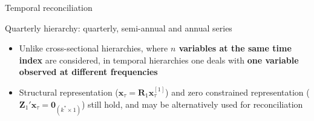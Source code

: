 \documentclass[aspectratio=169, table,colorlinks]{beamer}
\newcommand{\relation}[3]
{
	\draw (#3.south) -- +(0,-#1) -| ($ (#2.north) $)
}
\newcommand{\xvet}{\bm{x}}
\newcommand{\Rvet}{\bm{R}}
\newcommand{\Zvet}{\bm{Z}}
\newcommand{\Zerovet}{\bm{0}}
\begin{document}
\begin{frame}{Temporal reconciliation}
\begin{center}
\vskip0.2cm
{\scriptsize Quarterly hierarchy: quarterly, {\color{avocado}semi-annual} and {\color{newblue}annual} series}
\end{center}
\vskip0.2cm
\begin{itemize}[itemsep=0.15cm]
	\item Unlike cross-sectional hierarchies, where \textbf{$n$ variables at the same time index} are considered, in temporal hierarchies one deals with \textbf{one variable observed at different frequencies}
	\item {\color{newblue}Structural representation} ($\xvet_{\tau} = \Rvet_1\xvet^{[1]}_{\tau}$) and {\color{newblue}zero constrained representation} ($\Zvet_1'\xvet_{\tau} = \Zerovet_{(k^* \times 1)}$) still hold, and may be alternatively used for reconciliation
\end{itemize}
\end{frame}
\end{document}

